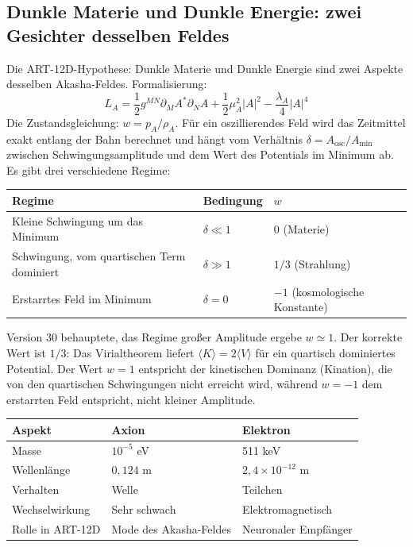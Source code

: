 \documentclass[11pt,a4paper]{article}
\begin{document}
\subsection{Dunkle Materie und Dunkle Energie: zwei Gesichter desselben Feldes}
Die ART-12D-Hypothese: Dunkle Materie und Dunkle Energie sind zwei Aspekte desselben Akasha-Feldes. Formalisierung:
\begin{equation}
L_A = \frac{1}{2} g^{MN} \partial_M A^* \partial_N A + \frac{1}{2} \mu_A^2 |A|^2 - \frac{\lambda_A}{4} |A|^4
\end{equation}
Die Zustandsgleichung: $w = p_A / \rho_A$. Für ein oszillierendes Feld wird das Zeitmittel exakt entlang der Bahn berechnet und hängt vom Verhältnis $\delta = A_{\text{osc}}/A_{\min}$ zwischen Schwingungsamplitude und dem Wert des Potentials im Minimum ab. Es gibt drei verschiedene Regime:
\begin{center}
\begin{tabular}{@{}lll@{}}
\toprule
\textbf{Regime} & \textbf{Bedingung} & $w$ \\ \midrule
Kleine Schwingung um das Minimum & $\delta \ll 1$ & $0$ (Materie) \\
Schwingung, vom quartischen Term dominiert & $\delta \gg 1$ & $1/3$ (Strahlung) \\
Erstarrtes Feld im Minimum & $\delta = 0$ & $-1$ (kosmologische Konstante) \\ \bottomrule
\end{tabular}
\end{center}
Version 30 behauptete, das Regime großer Amplitude ergebe $w \simeq 1$. Der korrekte Wert ist $1/3$: Das Virialtheorem liefert $\langle K \rangle = 2\langle V \rangle$ für ein quartisch dominiertes Potential. Der Wert $w = 1$ entspricht der kinetischen Dominanz (Kination), die von den quartischen Schwingungen nicht erreicht wird, während $w = -1$ dem erstarrten Feld entspricht, nicht kleiner Amplitude.
\begin{table}[H]
\centering
\begin{tabular}{@{}lll@{}}
\toprule
\textbf{Aspekt} & \textbf{Axion} & \textbf{Elektron} \\ \midrule
Masse & \(10^{-5}\) eV & 511 keV \\
Wellenlänge & \(0,124\) m & \(2,4\times10^{-12}\) m \\
Verhalten & Welle & Teilchen \\
Wechselwirkung & Sehr schwach & Elektromagnetisch \\
Rolle in ART-12D & Mode des Akasha-Feldes & Neuronaler Empfänger \\ \bottomrule
\end{tabular}
\end{table}
\end{document}
